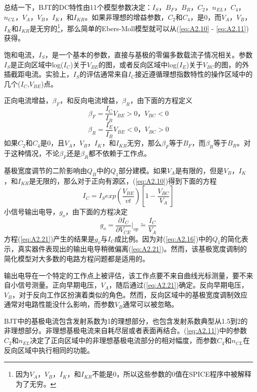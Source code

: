 总结一下，BJT的DC特性由11个模型参数决定：$I_S$，$B_F$，$B_R$，$C_2$，$n_{EL}$，$C_4$，$n_{CL}$，$V_A$，$V_B$，$I_K$，和$I_{KR}$。如果非理想的增益参数，$C_2$和$C_4$，是0，而$V_A$，$V_B$，$I_K$和$I_{KR}$是无穷的\footnote{因为$V_A$，$V_B$，$I_K$，和$I_{KR}$不能是0，所以这些参数的0值在SPICE程序中被解释为了无穷。}，那么简单的Ebers-Moll模型\cite{ref-78}就可以从(\ref{eq:A2.10} - \ref{eq:A2.11})获得。

饱和电流，$I_S$，是一个基本的参数，直接与基极\cite{ref-84}的零偏多数载流子情况相关。参数$I_S$是正向区域中log($I_C$)关于$V_{BE}$的图，或者反向区域中log($I_E$)关于$V_{BC}$的图，的外插截距电流。实验上，$I_S$的评估通常来自$I_C$接近遵循理想指数特性的操作区域中的几个($I_C$,$V_{BE}$)点。

正向电流增益，$\beta_F$，和反向电流增益，$\beta_R$，由下面的方程定义
\begin{equation}
    \beta_F = \frac{I_C}{I_B} V_{BE}>0，V_{BC}<0
    \label{eq:A2.18}
\end{equation}
\begin{equation}
    \beta_R = \frac{I_E}{I_B} V_{BE}<0，V_{BC}>0
    \label{eq:A2.19}
\end{equation}
如果$C_2$和$C_4$是0，且$V_A$，$V_B$，$I_K$，和$I_{KR}$无穷，那么$\beta_F$等于$B_F$，而$\beta_R$等于$B_R$。对于这种情况，不论$\beta_F$还是$\beta_R$都不依赖于工作点。

基极宽度调节\cite{ref-79}的二阶影响由$Q_B$中的$Q_1$部分建模。如果$V_A$是有限的，但是$V_B$，$I_K$，和$I_{KR}$是无限的，那么对于正向有源区，(\ref{eq:A2.10})得到下面的方程
\begin{equation}
    I_C = I_S exp(\frac{V_{BE}}{vt})[1-\frac{V_{BC}}{V_A}]
    \label{eq:A2.20}
\end{equation}
小信号输出电导，$g_o$，由下面的方程决定
\begin{equation}
    g_o = \frac{\partial I_C}{\partial V_{CE}}|_{op} \widetilde{=} \frac{I_C}{V_A}
    \label{eq:A2.21}
\end{equation}
方程(\ref{eq:A2.21})产生的结果是$g_o$与$I_C$成比例。因为对(\ref{eq:A2.16})中的$Q_1$的简化表示，真实器件表现出的输出电导稍微偏离(\ref{eq:A2.21})。然而，该基极宽度调制的简化模型对大多数的电路方程问题都是适用的。

输出电导在一个特定的工作点上被评估，该工作点要不来自曲线光标测量，要不来自小信号测量。正向早期电压，$V_A$，随后通过(\ref{eq:A2.21})确定。反向早期电压，$V_B$，对于反向工作区扮演着类似的角色。然而，反向区域中的基极宽度调制效应通常对电路性能没什么影响，而参数$V_B$通常可以被忽略。

BJT中的基极电流包含发射系数为1的理想部分，也包含发射系数典型从1.5到2的非理想部分。非理想基极电流来自耗尽层或者表面再结合\cite{ref-85}。(\ref{eq:A2.11})中的参数$C_2$和$n_{EL}$决定了正向区域中的非理想基极电流部分的相对幅度，而参数$C_4$和$n_{CL}$在反向区域中执行相同的功能。

